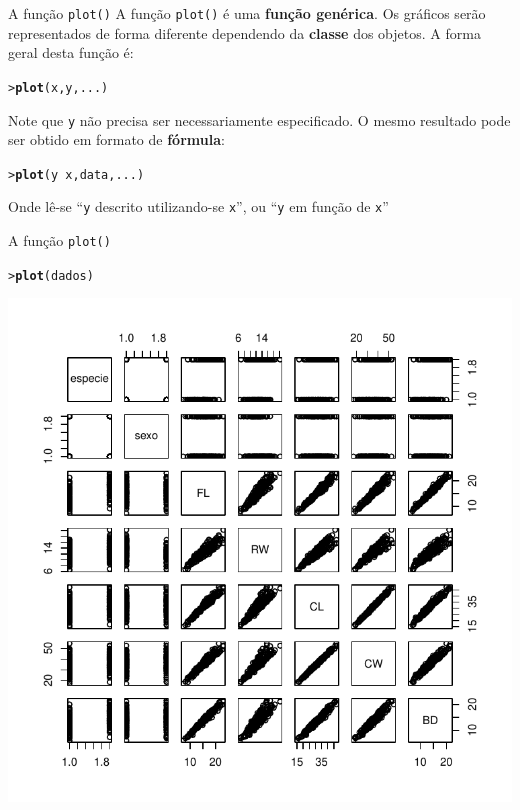 \documentclass[10pt]{beamer}\usepackage{graphicx, color}
\makeatletter
\newcommand{\hlfunctioncall}[1]{\textcolor[rgb]{0,0,0.545098039215686}{\textbf{#1}}}%
\newenvironment{kframe}{%
 \def\at@end@of@kframe{}%
 \ifinner\ifhmode%
  \def\at@end@of@kframe{\end{minipage}}%
  \begin{minipage}{\columnwidth}%
 \fi\fi%
 \def\FrameCommand##1{\hskip\@totalleftmargin \hskip-\fboxsep
 \colorbox{shadecolor}{##1}\hskip-\fboxsep
     \hskip-\linewidth \hskip-\@totalleftmargin \hskip\columnwidth}%
 \MakeFramed {\advance\hsize-\width
   \@totalleftmargin\z@ \linewidth\hsize
   \@setminipage}}%
 {\par\unskip\endMakeFramed%
 \at@end@of@kframe}
\newenvironment{knitrout}{}{} %
\makeatother
\begin{document}
\begin{frame}[fragile=singleslide]{A função \texttt{plot()}}
A função \texttt{plot()} é uma \textbf{função genérica}. Os gráficos serão
representados de forma diferente dependendo da \textbf{classe} dos
objetos. A forma geral desta função é:
\begin{knitrout}\small
{}\color{fgcolor}\begin{kframe}
\begin{alltt}
> \hlfunctioncall{plot}(x, y, ...)
\end{alltt}
\end{kframe}
\end{knitrout}

Note que \texttt{y} não precisa ser necessariamente especificado. O
mesmo resultado pode ser obtido em formato de \textbf{fórmula}:
\begin{knitrout}\small
{}\color{fgcolor}\begin{kframe}
\begin{alltt}
> \hlfunctioncall{plot}(y ~ x, data, ...)
\end{alltt}
\end{kframe}
\end{knitrout}

Onde lê-se ``\texttt{y} descrito utilizando-se \texttt{x}'', ou
``\texttt{y} em função de \texttt{x}''
\end{frame}

\begin{frame}[fragile=singleslide]{A função \texttt{plot()}}
\begin{knitrout}\small
{}\color{fgcolor}\begin{kframe}
\begin{alltt}
> \hlfunctioncall{plot}(dados)
\end{alltt}
\end{kframe}

{\centering \includegraphics[width=.7\textwidth]{figure/unnamed-chunk-25} 

}


\end{knitrout}

\end{frame}
\end{document}
